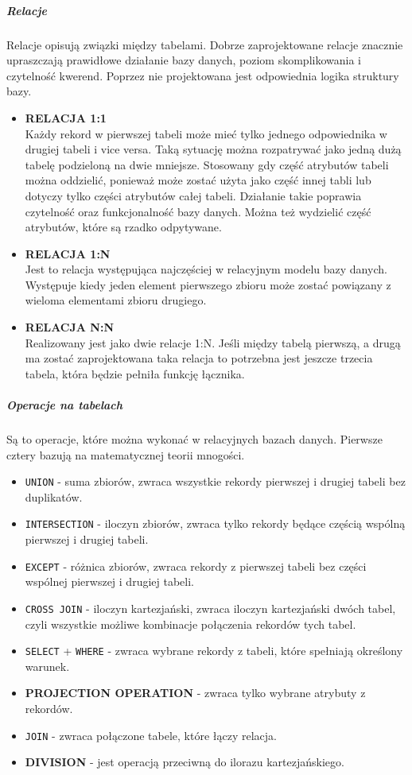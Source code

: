 \documentclass[polish, 11pt]{article}
\begin{document}
  	 	\subparagraph{Relacje\\}
  	 	Relacje opisują związki między tabelami. Dobrze zaprojektowane relacje znacznie upraszczają prawidłowe działanie bazy danych,
  	 	poziom skomplikowania i czytelność kwerend. Poprzez nie  projektowana jest odpowiednia logika struktury bazy.
  	 	\begin{itemize}
  	 	\item \textbf{RELACJA 1:1}\\
  	 	Każdy rekord w pierwszej tabeli może mieć tylko jednego odpowiednika w drugiej tabeli i vice versa. 
  	 	Taką sytuację można rozpatrywać jako jedną dużą tabelę podzieloną na dwie mniejsze. Stosowany gdy 
  	 	część atrybutów tabeli można oddzielić, ponieważ może zostać użyta jako część innej tabli lub dotyczy 
  	 	tylko części atrybutów całej tabeli. Działanie takie poprawia czytelność oraz funkcjonalność bazy danych. Można 
  	 	też wydzielić część atrybutów, które są rzadko odpytywane.
  	 	\item \textbf{RELACJA 1:N}\\
  	 	Jest to relacja występująca najczęściej w relacyjnym modelu bazy danych. Występuje kiedy jeden element pierwszego 
  	 	zbioru może zostać powiązany z wieloma elementami zbioru drugiego. 
  	 	\item \textbf{RELACJA N:N}\\
  	 	Realizowany jest jako dwie relacje 1:N. Jeśli między tabelą pierwszą, a drugą ma zostać zaprojektowana taka relacja to potrzebna jest jeszcze 
  	 	trzecia tabela, która będzie pełniła funkcję łącznika. 
  	 	\end{itemize}
  	 	\subparagraph{Operacje na tabelach\\}
  	 	Są to operacje, które można wykonać w relacyjnych bazach danych. Pierwsze cztery bazują na matematycznej teorii mnogości.
  	 	\begin{itemize}
  	 	\item \texttt{UNION} - suma zbiorów, zwraca wszystkie rekordy pierwszej i drugiej tabeli bez duplikatów.
  	 	\item \texttt{INTERSECTION} - iloczyn zbiorów, zwraca tylko rekordy będące częścią wspólną pierwszej i drugiej tabeli.
  	 	\item \texttt{EXCEPT} - różnica zbiorów, zwraca rekordy z pierwszej tabeli bez części wspólnej pierwszej i drugiej tabeli.
  	 	\item \texttt{CROSS JOIN} - iloczyn kartezjański, zwraca iloczyn kartezjański dwóch tabel, czyli wszystkie możliwe kombinacje połączenia
  	 	rekordów tych tabel.
  	 	\item \texttt{SELECT} + \texttt{WHERE} - zwraca wybrane rekordy z tabeli, które spełniają określony warunek.
  	 	\item \textbf{PROJECTION OPERATION} - zwraca tylko wybrane atrybuty z rekordów.
  	 	\item \texttt{JOIN} - zwraca połączone tabele, które łączy relacja.
  	 	\item \textbf{DIVISION} - jest operacją przeciwną do ilorazu kartezjańskiego.
  	 	\end{itemize}
  		
\end{document}
